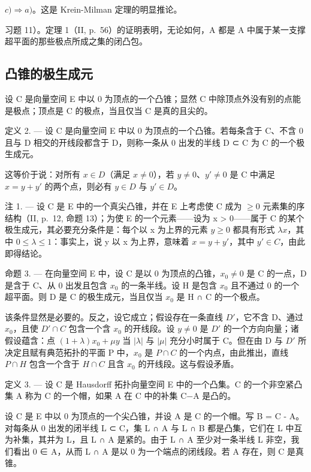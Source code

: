 \(c) \Rightarrow a)\)。这是 Krein-Milman 定理的明显推论。

习题 11）。定理 1（II, p.~56）的证明表明，无论如何，A 都是 A 中属于某一支撑超平面的那些极点所成之集的闭凸包。

\subsection{凸锥的极生成元}

设 C 是向量空间 E 中以 0 为顶点的一个凸锥；显然 C 中除顶点外没有别的点能是极点；顶点是 C 的极点，当且仅当 C 是真的且尖的。

定义 2. --- 设 C 是向量空间 E 中以 0 为顶点的一个凸锥。若每条含于 C、不含 0 且与 D 相交的开线段都含于 D，则称一条从 0 出发的半线 D ⊂ C 为 C 的一个极生成元。

这等价于说：对所有 \(x \in D\)（满足 \(x \neq 0\)），若 \(y \neq 0\)、\(y' \neq 0\) 是 C 中满足 \(x = y + y'\) 的两个点，则必有 \(y \in D\) 与 \(y' \in D\)。

注 1. --- 设 C 是 E 中的一个真尖凸锥，并在 E 上考虑使 C 成为 \(\geqslant 0\) 元素集的序结构（II, p.~12, 命题 13）；为使 E 的一个元素——设为 x \textgreater{} 0——属于 C 的某个极生成元，其必要充分条件是：每个以 x 为上界的元素 \(y \geqslant 0\) 都具有形式 \(\lambda x\)，其中 \(0 \leqslant \lambda \leqslant 1\)：事实上，说 y 以 x 为上界，意味着 \(x = y + y'\)，其中 \(y' \in C\)，由此即得结论。

命题 3. --- 在向量空间 E 中，设 C 是以 0 为顶点的凸锥，\(x_{0} \neq 0\) 是 C 的一点，D 是含于 C、从 0 出发且包含 \(x_{0}\) 的一条半线。设 H 是包含 \(x_{0}\) 且不通过 0 的一个超平面。则 D 是 C 的极生成元，当且仅当 \(x_{0}\) 是 H ∩ C 的一个极点。

该条件显然是必要的。反之，设它成立；假设存在一条直线 \(D'\)，它不含 D、通过 \(x_{0}\)，且使 \(D' \cap C\) 包含一个含 \(x_{0}\) 的开线段。设 \(y \neq 0\) 是 \(D'\) 的一个方向向量；诸假设蕴含：点 \((1 + \lambda)x_{0} + \mu y\) 当 \(|\lambda|\) 与 \(|\mu|\) 充分小时属于 C。但在由 D 与 \(D'\) 所决定且赋有典范拓扑的平面 P 中，\(x_{0}\) 是 \(P \cap C\) 的一个内点，由此推出，直线 \(P \cap H\) 包含一个含于 \(H \cap C\) 且含 \(x_{0}\) 的开线段。这与假设矛盾。

定义 3. --- 设 C 是 Hausdorff 拓扑向量空间 E 中的一个凸集。C 的一个非空紧凸集 A 称为 C 的一个帽，如果 A 在 C 中的补集 C−A 是凸的。

设 C 是 E 中以 0 为顶点的一个尖凸锥，并设 A 是 C 的一个帽。写 B = C - A。对每条从 0 出发的闭半线 L ⊂ C，集 L ∩ A 与 L ∩ B 都是凸集，它们在 L 中互为补集，其并为 L，且 L ∩ A 是紧的。由于 L ∩ A 至少对一条半线 L 非空，我们看出 0 ∈ A，从而 L ∩ A 是以 0 为一个端点的闭线段。若 A 存在，则 C 是真锥。

